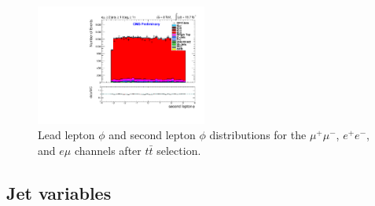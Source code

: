 \documentclass[oneside, a4paper, 11pt, ]{report}
\begin{document}
\begin{figure}
\includegraphics[width=0.5\textwidth]{Plots/ControlPlots/TTbarDiLeptonAnalysis/EMu/DiLepton/SecondLepton_Phi_splitTTbar_ratio.pdf}
\caption{Lead lepton $\phi$ and second lepton $\phi$ distributions for the $\mu^{+}\mu^{-}$, $e^{+}e^{-}$, and $e\mu$ channels after $t\bar{t}$ selection.}
\label{fig-leptonLeadPhiSecondPhi}
\end{figure}

\subsection{Jet variables} \label{subsec-jetPlots}
\end{document}
